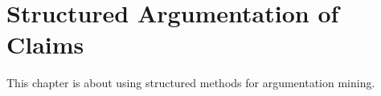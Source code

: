 \chapter{Structured Argumentation of Claims}

This chapter is about using structured methods for argumentation mining.
